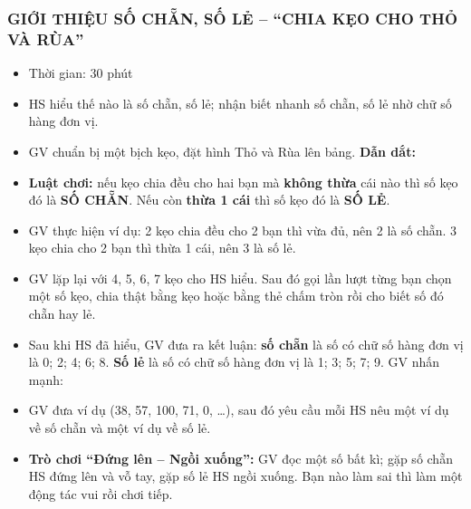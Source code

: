 \documentclass[../main.tex]{subfiles}
\begin{document}
\subsubsection{GIỚI THIỆU SỐ CHẴN, SỐ LẺ -- “CHIA KẸO CHO THỎ VÀ RÙA”}
\begin{hd}
    \begin{itemize}
        \item Thời gian: 30 phút
        \item HS hiểu thế nào là số chẵn, số lẻ; nhận biết nhanh số chẵn, số lẻ nhờ chữ số hàng đơn vị.
    \end{itemize}
\end{hd}
\begin{itemize}
    \item GV chuẩn bị một bịch kẹo, đặt hình Thỏ và Rùa lên bảng. \textbf{Dẫn dắt:} 
    \item \textbf{Luật chơi:} nếu kẹo chia đều cho hai bạn mà \textbf{không thừa} cái nào thì số kẹo đó là \textbf{SỐ CHẴN}. Nếu còn \textbf{thừa 1 cái} thì số kẹo đó là \textbf{SỐ LẺ}.
    \item GV thực hiện ví dụ: 2 kẹo chia đều cho 2 bạn thì vừa đủ, nên 2 là số chẵn. 3 kẹo chia cho 2 bạn thì thừa 1 cái, nên 3 là số lẻ.
\end{itemize}
\begin{center}
    \hfill{}
\end{center}
\begin{itemize}
    \item GV lặp lại với 4, 5, 6, 7 kẹo cho HS hiểu. Sau đó gọi lần lượt từng bạn chọn một số kẹo, chia thật bằng kẹo hoặc bằng thẻ chấm tròn rồi cho biết số đó chẵn hay lẻ.
\end{itemize}
\begin{center}
    \GAthechiam
\end{center}
\begin{itemize}
    \item Sau khi HS đã hiểu, GV đưa ra kết luận: \textbf{số chẵn} là số có chữ số hàng đơn vị là 0; 2; 4; 6; 8. \textbf{Số lẻ} là số có chữ số hàng đơn vị là 1; 3; 5; 7; 9. GV nhấn mạnh: 
    \item GV đưa ví dụ (38, 57, 100, 71, 0, \dots), sau đó yêu cầu mỗi HS nêu một ví dụ về số chẵn và một ví dụ về số lẻ.
    \item \textbf{Trò chơi “Đứng lên -- Ngồi xuống”:} GV đọc một số bất kì; gặp số chẵn HS đứng lên và vỗ tay, gặp số lẻ HS ngồi xuống. Bạn nào làm sai thì làm một động tác vui rồi chơi tiếp.
\end{itemize}
\end{document}
